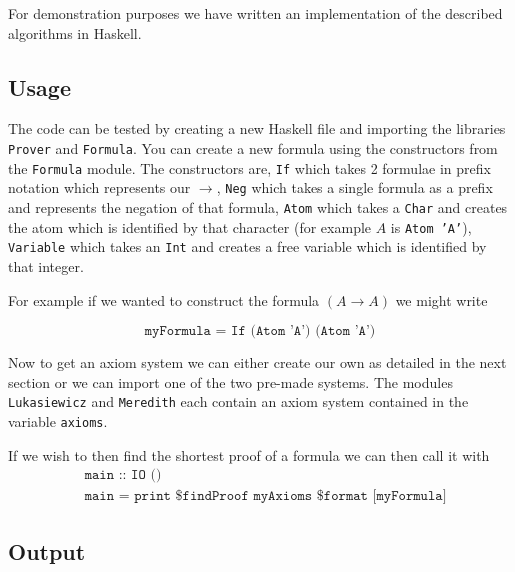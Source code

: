 \documentclass{article}
\begin{document}
For demonstration purposes we have written an implementation of the described algorithms in Haskell.

\subsection{Usage}

The code can be tested by creating a new Haskell file and importing the libraries \texttt{Prover} and \texttt{Formula}.
You can create a new formula using the constructors from the \texttt{Formula} module.
The constructors are, \texttt{If} which takes 2 formulae in prefix notation which represents our $\rightarrow$,
\texttt{Neg} which takes a single formula as a prefix and represents the negation of that formula,
\texttt{Atom} which takes a \texttt{Char} and creates the atom which is identified by that character (for example $A$ is \texttt{Atom 'A'}),
\texttt{Variable} which takes an \texttt{Int} and creates a free variable which is identified by that integer.

For example if we wanted to construct the formula $(A\rightarrow A)$ we might write

\begin{equation*}
\texttt{myFormula = If (Atom 'A') (Atom 'A')}
\end{equation*}

Now to get an axiom system we can either create our own as detailed in the next section or we can import one of the two pre-made systems.
The modules \texttt{Lukasiewicz} and \texttt{Meredith} each contain an axiom system contained in the variable \texttt{axioms}.

If we wish to then find the shortest proof of a formula we can then call it with
\begin{align*}
&\texttt{main :: IO ()} \\
&\texttt{main = print \$ findProof myAxioms \$ format [myFormula]}
\end{align*}

\subsection{Output}
\end{document}
